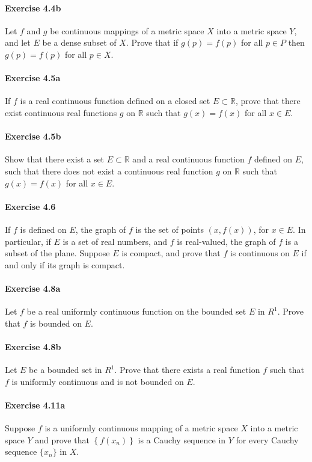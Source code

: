 \documentclass{article}
\theoremstyle{definition}
\begin{document}
\paragraph{Exercise 4.4b} Let $f$ and $g$ be continuous mappings of a metric space $X$ into a metric space $Y$, and let $E$ be a dense subset of $X$. Prove that if $g(p) = f(p)$ for all $p \in P$ then $g(p) = f(p)$ for all $p \in X$.

\paragraph{Exercise 4.5a} If $f$ is a real continuous function defined on a closed set $E \subset \mathbb{R}$, prove that there exist continuous real functions $g$ on $\mathbb{R}$ such that $g(x)=f(x)$ for all $x \in E$.

\paragraph{Exercise 4.5b} Show that there exist a set $E \subset \mathbb{R}$ and a real continuous function $f$ defined on $E$, such that there does not exist a continuous real function $g$ on $\mathbb{R}$ such that $g(x)=f(x)$ for all $x \in E$.

\paragraph{Exercise 4.6} If $f$ is defined on $E$, the graph of $f$ is the set of points $(x, f(x))$, for $x \in E$. In particular, if $E$ is a set of real numbers, and $f$ is real-valued, the graph of $f$ is a subset of the plane. Suppose $E$ is compact, and prove that $f$ is continuous on $E$ if and only if its graph is compact.

\paragraph{Exercise 4.8a} Let $f$ be a real uniformly continuous function on the bounded set $E$ in $R^{1}$. Prove that $f$ is bounded on $E$.

\paragraph{Exercise 4.8b} Let $E$ be a bounded set in $R^{1}$. Prove that there exists a real function $f$ such that $f$ is uniformly continuous and is not bounded on $E$.

\paragraph{Exercise 4.11a} Suppose $f$ is a uniformly continuous mapping of a metric space $X$ into a metric space $Y$ and prove that $\left\{f\left(x_{n}\right)\right\}$ is a Cauchy sequence in $Y$ for every Cauchy sequence $\{x_n\}$ in $X$.
\end{document}

